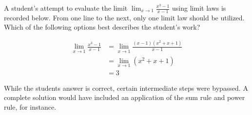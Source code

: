\documentclass{ximera}
\author{Steven Gubkin}
\begin{document}
\begin{exercise}

	A student's attempt to evaluate the limit $\lim_{x \to 1} \frac{x^3-1}{x-1}$ using limit laws is recorded below.   From one line to the next, only one limit law should be utilized.  
	Which of the following options best describes the student's work?
	
	\begin{align*}
		\lim_{x \to 1} \frac{x^3-1}{x-1} &= \lim_{x \to 1} \frac{(x-1)(x^2+x+1)}{x-1}\\
		&= \lim_{x \to 1} \left( x^2 + x + 1\right)\\
		&= 3
	\end{align*}
	
	\begin{multipleChoice}
	\end{multipleChoice}
	
	\begin{feedback}
		While the students answer is correct, certain intermediate steps were bypassed.   A complete solution would have included an application of the sum rule and power rule, for instance.
	\end{feedback}
	
\end{exercise}
\end{document}
